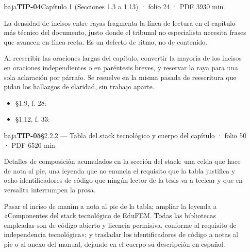 \begin{ficha}{baja}{\casilla\textbf{TIP-04}\quad{}\quad Capítulo 1 (Secciones 1.3 a 1.13) · folio 24 · PDF 39\hfill 30 min}
\par
{}La densidad de incisos entre rayas fragmenta la línea de lectura en el capítulo más técnico del documento, justo donde el tribunal no especialista necesita frases que avancen en línea recta. Es un defecto de ritmo, no de contenido.\par
{}Al reescribir las oraciones largas del capítulo, convertir la mayoría de los incisos en oraciones independientes o en paréntesis breves, y reservar la raya para una sola aclaración por párrafo. Se resuelve en la misma pasada de reescritura que pidan los hallazgos de claridad, sin trabajo aparte.\par
{}\begin{itemize}[leftmargin=1.2em,itemsep=1pt,topsep=1pt]
\item {\small §1.9, f. 28: }
\item {\small §1.12, f. 33: }
\end{itemize}
\end{ficha}
\begin{ficha}{baja}{\casilla\textbf{TIP-05}\quad{}\quad §2.2.2 — Tabla del stack tecnológico y cuerpo del capítulo · folio 50 · PDF 65\hfill 20 min}
\par
{}Detalles de composición acumulados en la sección del stack: una celda que hace de nota al pie, una leyenda que no enuncia el requisito que la tabla justifica y ocho identificadores de código que ningún lector de la tesis va a teclear y que en versalita interrumpen la prosa.\par
{}Pasar el inciso de manim a nota al pie de la tabla; ampliar la leyenda a «Componentes del stack tecnológico de EduFEM. Todas las bibliotecas empleadas son de código abierto y licencia permisiva, conforme al requisito de independencia tecnológica»; y trasladar los identificadores de código a notas al pie o al anexo del manual, dejando en el cuerpo su descripción en español.\par
\end{ficha}
